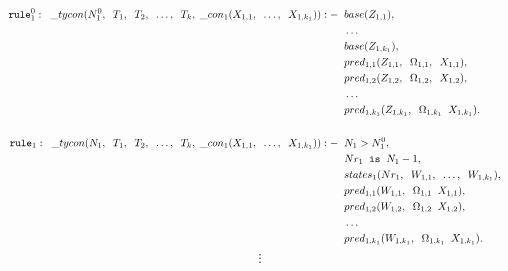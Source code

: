 	\begin{align*}
		\texttt{rule}_{1}^{0}: \;\; \_ tycon (N_{1}^{0}, \;\; T_1, \;\; T_2, \;\; \ldots, \;\; T_k, \; \_ con_1(X_{1,1}, \;\; \ldots, \;\; X_{1,k_1})) :-
		  & \;\; base(Z_{1,1}),                                                 &   &   \\
		  & \;\; \ldots                                                         &   &   \\
		  & \;\; base(Z_{1,k_1}),                                               &   &   \\
		  & \;\; pred_{1, 1}(Z_{1,1}, \;\; \Omega_{1,1}, \;\; X_{1,1}),         &   &   \\
		  & \;\; pred_{1, 2}(Z_{1,2}, \;\; \Omega_{1,2}, \;\; X_{1,2}),         &   &   \\
		  & \;\; \ldots \;\;                                                    &   &   \\
		  & \;\; pred_{1, k_1}(Z_{1,k_1}, \;\; \Omega_{1,k_1} \;\; X_{1,k_1}).  &   &   \\
		\\
		\texttt{rule}_1: \;\; \_ tycon (N_1, \;\; T_1, \;\; T_2, \;\; \ldots, \;\; T_k, \; \_ con_1(X_{1,1}, \;\; \ldots, \;\; X_{1,k_1})) :-
		  & \;\; N_1 > N_{1}^{0},                                               &   &   \\
		  & \;\; Nr_1 \;\; \texttt{is} \;\; N_1 - 1,                               &   &   \\
		  & \;\; states_1(Nr_1, \;\; W_{1,1}, \;\; \ldots, \;\; W_{1,k_1}),     &   &   \\
		  & \;\; pred_{1, 1}(W_{1,1}, \;\; \Omega_{1, 1} \;\; X_{1,1}),         &   &   \\
		  & \;\; pred_{1, 2}(W_{1,2}, \;\; \Omega_{1, 2} \;\; X_{1,2}),         &   &   \\
		  & \;\; \ldots \;\;                                                    &   &   \\
		  & \;\; pred_{1, k_1}(W_{1,k_1}, \;\; \Omega_{1, k_1} \;\; X_{1,k_1}). &   &   
	\end{align*}
	$$\vdots$$
